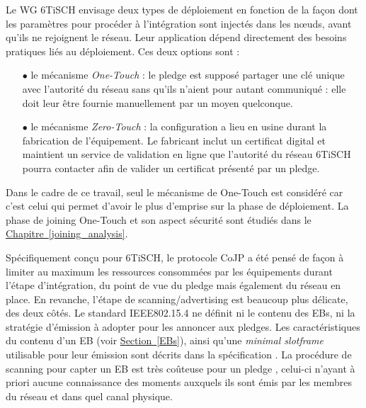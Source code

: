 \documentclass[]{report}
\newcommand{\wordlink}[2]{\hyperref[#2]{#1~\ref{#2}}}
\begin{document}
\vspace{0.5cm}

\par Le WG 6TiSCH envisage deux types de déploiement en fonction de la façon dont les paramètres pour procéder à l'intégration sont injectés dans les nœuds, avant qu'ils ne rejoignent le réseau. Leur application dépend directement des besoins pratiques liés au déploiement. Ces deux options sont \cite{6TiSCH-industrial-perf} :

\begin{itemize}
\item[$\bullet$] le mécanisme \textit{One-Touch} : le pledge est supposé partager une clé unique avec l'autorité du réseau sans qu'ils n'aient pour autant communiqué : elle doit leur être fournie manuellement par un moyen quelconque.
\item[$\bullet$] le mécanisme \textit{Zero-Touch} : la configuration a lieu en usine durant la fabrication de l'équipement. Le fabricant inclut un certificat digital et maintient un service de validation en ligne que l'autorité du réseau 6TiSCH pourra contacter afin de valider un certificat présenté par un pledge.
\end{itemize}

\vspace{0.1cm}

\noindent Dans le cadre de ce travail, seul le mécanisme de One-Touch est considéré car c'est celui qui permet d'avoir le plus d'emprise sur la phase de déploiement. La phase de joining One-Touch et son aspect sécurité sont étudiés dans le \wordlink{Chapitre}{joining_analysis}.\\

\par Spécifiquement conçu pour 6TiSCH, le protocole CoJP a été pensé de façon à limiter au maximum les ressources consommées par les équipements durant l'étape d'intégration, du point de vue du pledge mais également du réseau en place. En revanche, l'étape de scanning/advertising est beaucoup plus délicate, des deux côtés. Le standard IEEE802.15.4 \cite{IEEE802.15.4} ne définit ni le contenu des EBs, ni la stratégie d'émission à adopter pour les annoncer aux pledges. Les caractéristiques du contenu d'un EB (voir \wordlink{Section}{EBs}), ainsi qu'une \textit{minimal slotframe} utilisable pour leur émission sont décrits dans la spécification \cite{rfc8180}. La procédure de scanning pour capter un EB est très coûteuse pour un pledge \cite{join-TSCH-RPL}, celui-ci n'ayant à priori aucune connaissance des moments auxquels ils sont émis par les membres du réseau et dans quel canal physique.\\
\end{document}
